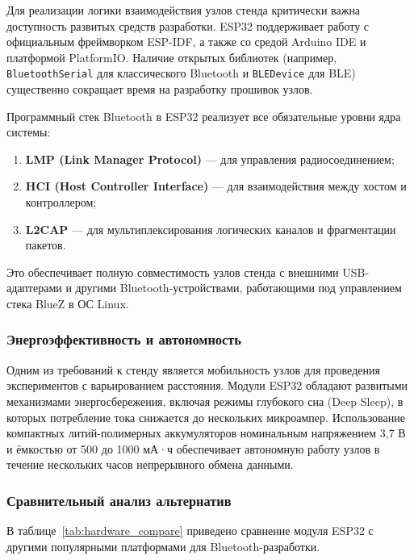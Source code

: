 Для реализации логики взаимодействия узлов стенда критически важна доступность развитых средств разработки. ESP32 поддерживает работу с официальным фреймворком ESP-IDF, а также со средой Arduino IDE и платформой PlatformIO. Наличие открытых библиотек (например, \texttt{BluetoothSerial} для классического Bluetooth и \texttt{BLEDevice} для BLE) существенно сокращает время на разработку прошивок узлов.

Программный стек Bluetooth в ESP32 реализует все обязательные уровни ядра системы:
\begin{enumerate}[nosep]
\item \textbf{LMP (Link Manager Protocol)} --- для управления радиосоединением;
\item \textbf{HCI (Host Controller Interface)} --- для взаимодействия между хостом и контроллером;
\item \textbf{L2CAP} --- для мультиплексирования логических каналов и фрагментации пакетов.
\end{enumerate}

Это обеспечивает полную совместимость узлов стенда с внешними USB-адаптерами и другими Bluetooth-устройствами, работающими под управлением стека BlueZ в ОС Linux.

\subsubsection{Энергоэффективность и автономность}

Одним из требований к стенду является мобильность узлов для проведения экспериментов с варьированием расстояния. Модули ESP32 обладают развитыми механизмами энергосбережения, включая режимы глубокого сна (Deep Sleep), в которых потребление тока снижается до нескольких микроампер. Использование компактных литий-полимерных аккумуляторов номинальным напряжением 3{,}7 В и ёмкостью от 500 до 1000 мА·ч обеспечивает автономную работу узлов в течение нескольких часов непрерывного обмена данными.

\subsubsection{Сравнительный анализ альтернатив}

В таблице~\ref{tab:hardware_compare} приведено сравнение модуля ESP32 с другими популярными платформами для Bluetooth-разработки.

